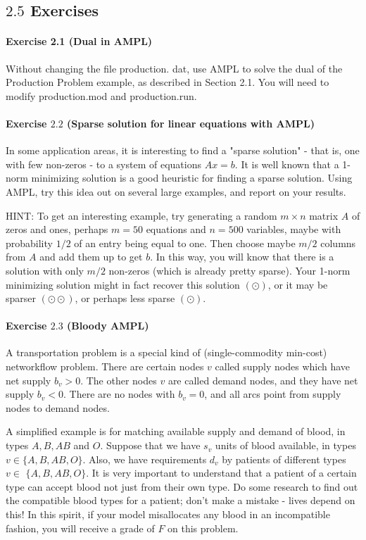 \subsection{$2.5$ Exercises}

\paragraph{Exercise 2.1 (Dual in AMPL)}

Without changing the file production. dat, use AMPL to solve the dual of the Production Problem example, as described in Section 2.1. You will need to modify production.mod and production.run.

\paragraph{Exercise $2.2$ (Sparse solution for linear equations with AMPL)}

In some application areas, it is interesting to find a "sparse solution" - that is, one with few non-zeros - to a system of equations $A x=b$. It is well known that a 1-norm minimizing solution is a good heuristic for finding a sparse solution. Using AMPL, try this idea out on several large examples, and report on your results.

HINT: To get an interesting example, try generating a random $m \times n$ matrix $A$ of zeros and ones, perhaps $m=50$ equations and $n=500$ variables, maybe with probability $1 / 2$ of an entry being equal to one. Then choose maybe $m / 2$ columns from $A$ and add them up to get $b$. In this way, you will know that there is a solution with only $m / 2$ non-zeros (which is already pretty sparse). Your 1-norm minimizing solution might in fact recover this solution $(\odot)$, or it may be sparser $(\odot \odot)$, or perhaps less sparse $(\odot)$.

\paragraph{Exercise $2.3$ (Bloody AMPL)}

A transportation problem is a special kind of (single-commodity min-cost) networkflow problem. There are certain nodes $v$ called supply nodes which have net supply $b_{v}>0$. The other nodes $v$ are called demand nodes, and they have net supply $b_{v}<0$. There are no nodes with $b_{v}=0$, and all arcs point from supply nodes to demand nodes.

A simplified example is for matching available supply and demand of blood, in types $A, B, A B$ and $O$. Suppose that we have $s_{v}$ units of blood available, in types $v \in\{A, B, A B, O\}$. Also, we have requirements $d_{v}$ by patients of different types $v \in$ $\{A, B, A B, O\}$. It is very important to understand that a patient of a certain type can accept blood not just from their own type. Do some research to find out the compatible blood types for a patient; don't make a mistake - lives depend on this! In this spirit, if your model misallocates any blood in an incompatible fashion, you will receive a grade of $F$ on this problem.

